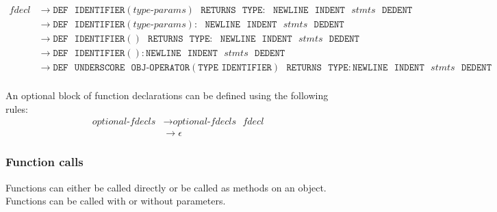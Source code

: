 \documentclass{article}
\begin{document}
\label{sec:fdecl}
\begin{align*}
    \textit{fdecl} &\to \texttt{DEF} \texttt{ } \texttt{IDENTIFIER}(\hyperref[sec:type-params]{\textit{type-params}}) \texttt{ } \texttt{RETURNS} \texttt{ } \texttt{TYPE}: \texttt{ } \texttt{NEWLINE} \texttt{ } \texttt{INDENT} \texttt{ } \hyperref[sec:stmts]{\textit{stmts}} \texttt{ } \texttt{DEDENT} \\
    &\to \texttt{DEF} \texttt{ } \texttt{IDENTIFIER}(\hyperref[sec:type-params]{\textit{type-params}}): \texttt{ } \texttt{NEWLINE} \texttt{ } \texttt{INDENT} \texttt{ } \hyperref[sec:stmts]{\textit{stmts}} \texttt{ } \texttt{DEDENT} \\
    &\to \texttt{DEF} \texttt{ } \texttt{IDENTIFIER}() \texttt{ } \texttt{RETURNS} \texttt{ } \texttt{TYPE}: \texttt{ } \texttt{NEWLINE} \texttt{ } \texttt{INDENT} \texttt{ } \hyperref[sec:stmts]{\textit{stmts}} \texttt{ } \texttt{DEDENT} \\
    &\to \texttt{DEF} \texttt{ } \texttt{IDENTIFIER}(): \texttt{NEWLINE} \texttt{ } \texttt{INDENT} \texttt{ } \hyperref[sec:stmts]{\textit{stmts}} \texttt{ } \texttt{DEDENT} \\
    &\to \texttt{DEF} \texttt{ } \texttt{UNDERSCORE} \texttt{ } \texttt{OBJ-OPERATOR}(\texttt{TYPE IDENTIFIER})\texttt{ } \texttt{RETURNS} \texttt{ } \texttt{TYPE}: \texttt{NEWLINE} \texttt{ } \texttt{INDENT} \texttt{ } \hyperref[sec:stmts]{\textit{stmts}} \texttt{ } \texttt{DEDENT} \\
\end{align*}

An optional block of function declarations can be defined using the following rules:
\label{sec:optional-fdecls}
\begin{align*}
    \textit{optional-fdecls} &\to \hyperref[sec:optional-fdecls]{\textit{optional-fdecls}} \texttt{ } \hyperref[sec:fdecl]{\textit{fdecl}} \\
    &\to \epsilon
\end{align*}

\subsubsection{Function calls}
Functions can either be called directly or be called as methods on an object. Functions can be called with or without parameters.
\end{document}
